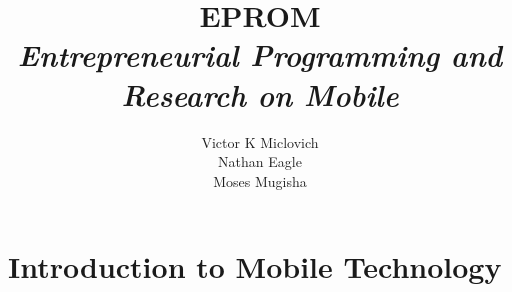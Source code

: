\documentclass[10pt,a4paper]{book}
\begin{document}
\title{EPROM\\
\textsl{Entrepreneurial Programming and Research on Mobile}}
\author{Victor K Miclovich\\Nathan Eagle\\Moses Mugisha}
\maketitle
\tableofcontents

\part{Introduction to Mobile Technology}
\end{document}
